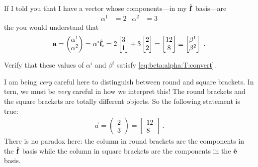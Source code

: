 \documentclass[12pt, oneside]{report}    %
\begin{document}
If I told you that I have a vector whose components---in my $\hat{\mathbf{f}}$ basis---are
\begin{align}
    \alpha^1 &= 2 & \alpha^2 &= 3    
\end{align}
the you would understand that
\begin{align}
    \mathbf{a} 
    = \begin{pmatrix}
        \alpha^1 \\ \alpha^2
    \end{pmatrix}
    =
        \alpha^i \hat{\mathbf{f}}_i 
        =
        2
    \begin{bmatrix}
        3 \\ 1
    \end{bmatrix}
    +
    3
    \begin{bmatrix}
        2 \\ 2
    \end{bmatrix}
    =
    \begin{bmatrix}
        12 \\
        8
    \end{bmatrix} 
    \equiv
    \begin{bmatrix}
        \beta^1 \\
        \beta^2
    \end{bmatrix}
    \ .
\end{align}
\begin{exercise}
Verify that these values of $\alpha^i$ and $\beta^i$ satisfy \eqref{eq:beta:alpha:T:convert}.
\end{exercise}
I am being \emph{very} careful here to distinguish between round and square brackets.
In tern, we must be \emph{very} careful in how we interpret this! The round brackets and the square brackets are totally different objects. So the following statement is true:
\begin{align}
    \vec{a} = \begin{pmatrix}
        2 \\ 3
    \end{pmatrix}
    = 
    \begin{bmatrix}
        12 \\ 8
    \end{bmatrix} \ .
\end{align}
There is no paradox here: the column in round brackets are the components in the $\hat{\mathbf{f}}$ basis while the column in square brackets are the components in the $\hat{\mathbf{e}}$ basis. 
\end{document}

